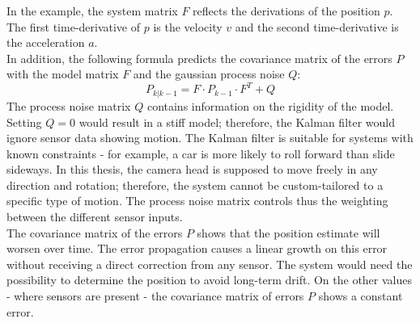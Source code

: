 In the example, the system matrix $F$ reflects the derivations of the position $p$. The first time-derivative of $p$ is the velocity $v$ and the second time-derivative is the acceleration $a$.\\
In addition, the following formula predicts the covariance matrix of the errors $P$ with the model matrix $F$ and the gaussian process noise $Q$:
\begin{equation*}
    P_{k|k-1} = 
    F
    \cdot
    P_{k-1}
    \cdot
    F^{T}
    +
    Q
\end{equation*}
The process noise matrix $Q$ contains information on the rigidity of the model. Setting $Q=0$ would result in a stiff model; therefore, the Kalman filter would ignore sensor data showing motion. The Kalman filter is suitable for systems with known constraints - for example, a car is more likely to roll forward than slide sideways. In this thesis, the camera head is supposed to move freely in any direction and rotation; therefore, the system cannot be custom-tailored to a specific type of motion. The process noise matrix controls thus the weighting between the different sensor inputs.\\
The covariance matrix of the errors $P$ shows that the position estimate will worsen over time. The error propagation causes a linear growth on this error without receiving a direct correction from any sensor. The system would need the possibility to determine the position to avoid long-term drift. On the other values - where sensors are present - the covariance matrix of errors $P$ shows a constant error.\\
